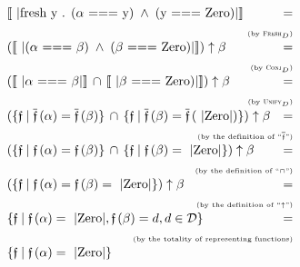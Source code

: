\renewcommand{\overset}[2]{#2}
\[
\begin{array}{lc}
  \sembr{\mbox{\lstinline|fresh y . ($\alpha$ === y) $\,\wedge\,$ (y === Zero)|}}&\overset{\mbox{(by \textsc{Fresh$_D$})}}{=}\\[1mm]
  \multicolumn{2}{r}{\mbox{\tiny (by \textsc{Fresh$_D$})}}\\
  (\sembr{\mbox{\lstinline|($\alpha$ === $\beta$) $\,\wedge\,$ ($\beta$ === Zero)|}})\uparrow\beta&\overset{\mbox{(by \textsc{Conj$_D$})}}{=}\\[1mm]
  \multicolumn{2}{r}{\mbox{\tiny (by \textsc{Conj$_D$})}}\\
  (\sembr{\mbox{\lstinline|$\alpha$ === $\beta$|}} \,\cap\, \sembr{\mbox{\lstinline|$\beta$ === Zero)|}})\uparrow\beta&\overset{\mbox{(by \textsc{Unify$_D$})}}{=}\\[1mm]
  \multicolumn{2}{r}{\mbox{\tiny (by \textsc{Unify$_D$})}}\\
  (\{\mathfrak{f}\mid \overline{\mathfrak{f}}\,(\alpha)=\overline{\mathfrak{f}}\,(\beta)\} \,\cap\, \{\mathfrak{f}\mid \overline{\mathfrak{f}}\,(\beta)=\overline{\mathfrak{f}}\,(\mbox{\lstinline|Zero|})\})\uparrow\beta&\overset{\mbox{(by the definition of ``$\overline{\mathfrak{f}}$'')}}{=}\\[1mm]
  \multicolumn{2}{r}{\mbox{\tiny (by the definition of ``$\overline{\mathfrak{f}}$'')}}\\
  (\{\mathfrak{f}\mid \mathfrak{f}\,(\alpha)=\mathfrak{f}\,(\beta)\} \,\cap\, \{\mathfrak{f}\mid \mathfrak{f}\,(\beta)=\mbox{\lstinline|Zero|}\})\uparrow\beta&\overset{\mbox{(by the definition of ``$\cap$'')}}{=}\\[1mm]
  \multicolumn{2}{r}{\mbox{\tiny (by the definition of ``$\cap$'')}}\\
  (\{\mathfrak{f}\mid \mathfrak{f}\,(\alpha)=\mathfrak{f}\,(\beta)=\mbox{\lstinline|Zero|}\})\uparrow\beta&\overset{\mbox{(by the definition of ``$\uparrow$'')}}{=}\\[1mm]
  \multicolumn{2}{r}{\mbox{\tiny (by the definition of ``$\uparrow$'')}}\\
  \{\mathfrak{f}\mid \mathfrak{f}\,(\alpha)=\mbox{\lstinline|Zero|}, \mathfrak{f}\,(\beta)=d, d\in\mathcal{D}\}&\overset{\mbox{(by the totality of representing functions)}}{=}\\[1mm]
  \multicolumn{2}{r}{\mbox{\tiny (by the totality of representing functions)}}\\
  \{\mathfrak{f}\mid \mathfrak{f}\,(\alpha)=\mbox{\lstinline|Zero|}\}&
\end{array}
\]

